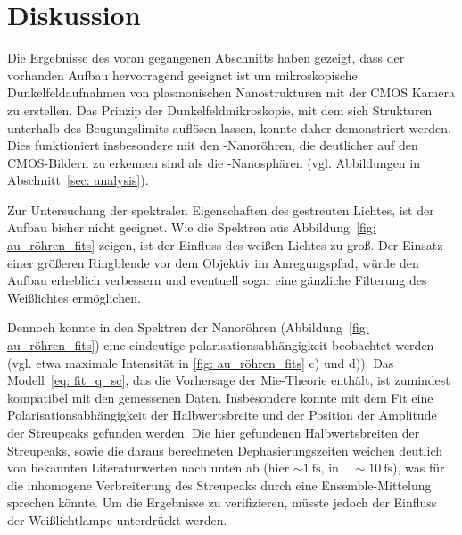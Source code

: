 \section{Diskussion}
Die Ergebnisse des voran gegangenen Abschnitts haben gezeigt, dass der vorhanden Aufbau hervorragend geeignet ist
um mikroskopische Dunkelfeldaufnahmen von plasmonischen Nanostrukturen mit der CMOS Kamera zu erstellen. Das Prinzip
der Dunkelfeldmikroskopie, mit dem sich Strukturen unterhalb des Beugungslimits auflösen lassen, konnte daher
demonstriert werden. Dies funktioniert insbesondere mit den -Nanoröhren, die
deutlicher auf den CMOS-Bildern zu erkennen sind als die -Nanosphären
(vgl. Abbildungen in Abschnitt~\ref{sec: analysis}).

Zur Untersuchung der spektralen Eigenschaften des gestreuten Lichtes, ist der Aufbau bisher nicht geeignet.
Wie die Spektren aus Abbildung~\ref{fig: au_röhren_fits} zeigen, ist der Einfluss des weißen Lichtes zu groß. Der Einsatz einer
größeren Ringblende vor dem Objektiv im Anregungspfad,
würde den Aufbau erheblich verbessern und eventuell sogar eine gänzliche Filterung des Weißlichtes
ermöglichen.

Dennoch konnte in den Spektren der Nanoröhren (Abbildung~\ref{fig: au_röhren_fits}) eine eindeutige
polarisationsabhängigkeit beobachtet werden (vgl. etwa maximale Intensität in \ref{fig: au_röhren_fits} c) und d)).
Das Modell~\eqref{eq: fit_q_sc}, das die Vorhersage der Mie-Theorie enthält, ist zumindest kompatibel mit den
gemessenen Daten. Insbesondere konnte mit dem Fit eine Polarisationsabhängigkeit der Halbwertsbreite und der Position der
Amplitude der Streupeaks gefunden werden. Die hier gefundenen Halbwertsbreiten der Streupeaks, sowie
die daraus berechneten Dephasierungszeiten weichen deutlich von bekannten Literaturwerten nach unten ab (hier $\sim\!\SI{1}{\femto\second}$,
in~\cite{t_deph} $~\!\sim{\SI{10}{\femto\second}}$), was für die inhomogene
Verbreiterung des Streupeaks durch eine Ensemble-Mittelung sprechen könnte.
Um die Ergebnisse zu verifizieren, müsste
jedoch der Einfluss der Weißlichtlampe unterdrückt werden.
